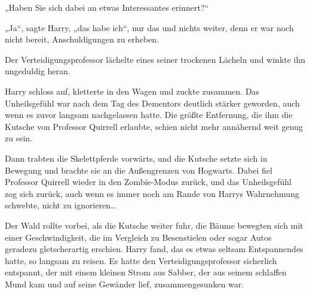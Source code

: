 „Haben Sie sich dabei an etwas Interessantes erinnert?“

„Ja“, sagte Harry, „das habe ich“, nur das und nichts weiter, denn er war noch nicht bereit, Anschuldigungen zu erheben.

Der Verteidigungsprofessor lächelte eines seiner trockenen Lächeln und winkte ihn ungeduldig heran.

Harry schloss auf, kletterte in den Wagen und zuckte zusammen. Das Unheilsgefühl war nach dem Tag des Dementors deutlich stärker geworden, auch wenn es zuvor langsam nachgelassen hatte. Die größte Entfernung, die ihm die Kutsche von Professor Quirrell erlaubte, schien nicht mehr annähernd weit genug zu sein.

Dann trabten die Skelettpferde vorwärts, und die Kutsche setzte sich in Bewegung und brachte sie an die Außengrenzen von Hogwarts. Dabei fiel Professor Quirrell wieder in den Zombie-Modus zurück, und das Unheilsgefühl zog sich zurück, auch wenn es immer noch am Rande von Harrys Wahrnehmung schwebte, nicht zu ignorieren…

Der Wald rollte vorbei, als die Kutsche weiter fuhr, die Bäume bewegten sich mit einer Geschwindigkeit, die im Vergleich zu Besenstielen oder sogar Autos geradezu gletscherartig erschien. Harry fand, das es etwas seltsam Entspannendes hatte, so langsam zu reisen. Es hatte den Verteidigungsprofessor sicherlich entspannt, der mit einem kleinen Strom aus Sabber, der aus seinem schlaffen Mund kam und auf seine Gewänder lief, zusammengesunken war.


